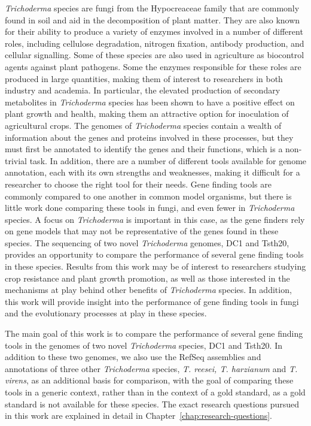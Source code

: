 \textit{Trichoderma} species are fungi from the Hypocreaceae family
that are commonly found in soil and aid in the decomposition of plant
matter.  They are also known for their ability to produce a variety of
enzymes involved in a number of different roles, including cellulose
degradation, nitrogen fixation, antibody production, and cellular
signalling. Some of these species are also used in agriculture as
biocontrol agents against plant pathogens. Some the enzymes
responsible for these roles are produced in large quantities, making
them of interest to researchers in both industry and academia. In
particular, the elevated production of secondary metabolites
in \textit{Trichoderma} species has been shown to have a positive
effect on plant growth and health, making them an attractive option
for inoculation of agricultural crops. The genomes
of \textit{Trichoderma} species contain a wealth of information about
the genes and proteins involved in these processes, but they must
first be annotated to identify the genes and their functions, which is
a non-trivial task. In addition, there are a number of different tools
available for genome annotation, each with its own strengths and
weaknesses, making it difficult for a researcher to choose the right
tool for their needs. Gene finding tools are commonly compared to one
another in common model organisms, but there is little work done
comparing these tools in fungi, and even fewer in \textit{Trichoderma}
species. A focus on \textit{Trichoderma} is important in this case, as
the gene finders rely on gene models that may not be representative of
the genes found in these species.  The sequencing of two
novel \textit{Trichoderma} genomes, DC1 and Tsth20, provides an
opportunity to compare the performance of several gene finding tools
in these species. Results from this work may be of interest to
researchers studying crop resistance and plant growth promotion, as
well as those interested in the mechanisms at play behind other
benefits of \textit{Trichoderma} species. In addition, this work will
provide insight into the performance of gene finding tools in fungi
and the evolutionary processes at play in these species.

The main goal of this work is to compare the performance of several
gene finding tools in the genomes of two novel \textit{Trichoderma}
species, DC1 and Tsth20. In addition to these two genomes, we also use
the RefSeq assemblies and annotations of three
other \textit{Trichoderma} species, \textit{T. reesei, T. harzianum}
and \textit{T. virens}, as an additional basis for comparison, with
the goal of comparing these tools in a generic context, rather than in
the context of a gold standard, as a gold standard is not available
for these species. The exact research questions pursued in this work
are explained in detail in Chapter~\ref{chap:research-questions}.

